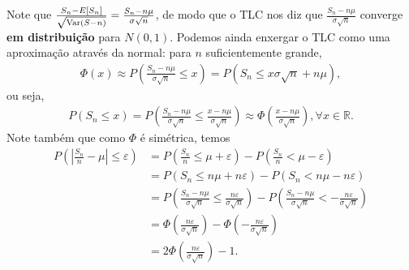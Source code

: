 \documentclass[../Notas.tex]{subfiles}
\begin{document}
Note que $\textstyle{ \frac{S_n - E[S_n]}{\sqrt{\text{Var}(S-n)}} = \frac{S_n - n\mu}{\sigma\sqrt{n}} }$, de modo que o TLC nos diz que $\displaystyle{ \frac{S_n - n\mu}{\sigma\sqrt{n}} }$ converge \textbf{em distribuição} para $N(0,1)$. Podemos ainda enxergar o TLC como uma aproximação através da normal: para $n$ suficientemente grande, 
\begin{align*}
    \Phi(x) \approx P\left( \frac{S_n - n\mu}{\sigma\sqrt{n}} \leq x \right) = P(S_n \leq x\sigma\sqrt{n} + n\mu),
\end{align*}
ou seja,
\begin{align*}
    P(S_n \leq x) = P\left( \frac{S_n - n\mu}{\sigma\sqrt{n}} \leq \frac{x - n\mu}{\sigma\sqrt{n}} \right) \approx \Phi\left( \frac{x - n\mu}{\sigma\sqrt{n}} \right), \forall x\in\mathbb{R}.
\end{align*}
Note também que como $\Phi$ é simétrica, temos
\begin{align*}
     P\left( \left| \frac{S_n}{n} - \mu \right| \leq \varepsilon \right) &= P\left( \frac{S_n}{n} \leq \mu + \varepsilon \right) - P\left( \frac{S_n}{n} < \mu - \varepsilon \right) \\
     &= P(S_n \leq n\mu + n\varepsilon) - P(S_n < n\mu - n\varepsilon) \\
     &= P\left( \frac{S_n - n\mu}{\sigma\sqrt{n}} \leq \frac{n\varepsilon}{\sigma\sqrt{n}} \right) - P\left( \frac{S_n - n\mu}{\sigma\sqrt{n}} < -\frac{n\varepsilon}{\sigma\sqrt{n}} \right) \\
     &= \Phi\left( \frac{n\varepsilon}{\sigma\sqrt{n}} \right) - \Phi\left( -\frac{n\varepsilon}{\sigma\sqrt{n}} \right) \\
     &= 2\Phi\left( \frac{n\varepsilon}{\sigma\sqrt{n}} \right) - 1.
\end{align*}
\end{document}
